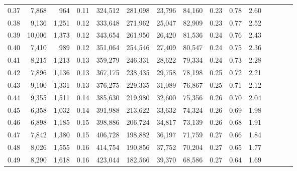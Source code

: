 \begin{tabular}{rrrcrrrrrrrrrrr}
0.37 &   7,868 &    964 &                                       0.11 &  324,512 &  281,098 &   23,796 &   84,160 &  0.23 &  0.78 &                         2.60 \\
0.38 &   9,136 &  1,251 &                                       0.12 &  333,648 &  271,962 &   25,047 &   82,909 &  0.23 &  0.77 &                         2.52 \\
0.39 &  10,006 &  1,373 &                                       0.12 &  343,654 &  261,956 &   26,420 &   81,536 &  0.24 &  0.76 &                         2.43 \\
0.40 &   7,410 &    989 &                                       0.12 &  351,064 &  254,546 &   27,409 &   80,547 &  0.24 &  0.75 &                         2.36 \\
0.41 &   8,215 &  1,213 &                                       0.13 &  359,279 &  246,331 &   28,622 &   79,334 &  0.24 &  0.73 &                         2.28 \\
0.42 &   7,896 &  1,136 &                                       0.13 &  367,175 &  238,435 &   29,758 &   78,198 &  0.25 &  0.72 &                         2.21 \\
0.43 &   9,100 &  1,331 &                                       0.13 &  376,275 &  229,335 &   31,089 &   76,867 &  0.25 &  0.71 &                         2.12 \\
0.44 &   9,355 &  1,511 &                                       0.14 &  385,630 &  219,980 &   32,600 &   75,356 &  0.26 &  0.70 &                         2.04 \\
0.45 &   6,358 &  1,032 &                                       0.14 &  391,988 &  213,622 &   33,632 &   74,324 &  0.26 &  0.69 &                         1.98 \\
0.46 &   6,898 &  1,185 &                                       0.15 &  398,886 &  206,724 &   34,817 &   73,139 &  0.26 &  0.68 &                         1.91 \\
0.47 &   7,842 &  1,380 &                                       0.15 &  406,728 &  198,882 &   36,197 &   71,759 &  0.27 &  0.66 &                         1.84 \\
0.48 &   8,026 &  1,555 &                                       0.16 &  414,754 &  190,856 &   37,752 &   70,204 &  0.27 &  0.65 &                         1.77 \\
0.49 &   8,290 &  1,618 &                                       0.16 &  423,044 &  182,566 &   39,370 &   68,586 &  0.27 &  0.64 &                         1.69 \\

\end{tabular}
